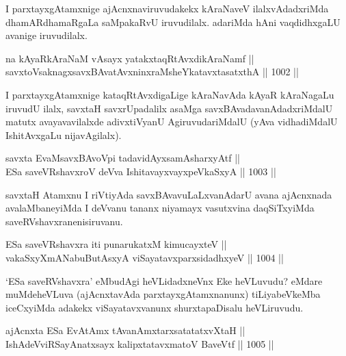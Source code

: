\begin{artha}
 I parxtayxgAtamxnige ajAcnxnaviruvudakekx kAraNaveV ilalxvAdadxriMda dhamARdhamaRgaLa saMpakaRvU iruvudilalx. adariMda hAni vaqdidhxgaLU avanige iruvudilalx.
\end{artha}


\begin{shl}
na kAyaRkAraNaM vA\s sayx yatakxtaqRtAvxdikAraNamf || \\
savxtoV\s saknagxsavxBAvatAvxninxraMsheYkatavxtasatxthA \hfill || 1002 ||  
\end{shl}

\begin{artha}
I parxtayxgAtamxnige kataqRtAvxdigaLige kAraNavAda kAyaR kAraNagaLu iruvudU ilalx, savxtaH savxrUpadalilx asaMga savxBAvadavanAdadxriMdalU matutx avayavavilalxde adivxtiVyanU AgiruvudariMdalU (yAva vidhadiMdalU IshitAvxgaLu nijavAgilalx).
\end{artha}

\begin{shl}
savxta EvaMsavxBAvoV\s pi tadavidAyxsamAsharxyAtf || \\
ESa saveVRshavxroV deVva IshitavayxvayxpeVkaSxyA \hfill || 1003 ||  
\end{shl}

\begin{artha}
savxtaH Atamxnu I riVtiyAda savxBAvavuLaLxvanAdarU avana ajAcnxnada avalaMbaneyiMda I deVvanu tananx niyamayx vasutxvina daqSiTxyiMda saveRVshavxranenisiruvanu.
\end{artha}


\begin{shl}
ESa saveVRshavxra iti punarukatxM kimucayxteV || \\
vakaSxyXmANabuButAsxyA viSayatavxparxsidadhxyeV \hfill || 1004 ||  
\end{shl}

\begin{artha}
`ESa saveRVshavxra' eMbudAgi heVLidadxneVnx Eke heVLuvudu? eMdare muMdeheVLuva (ajAcnxtavAda parxtayxgAtamxnanunx) tiLiyabeVkeMba iceCxyiMda adakekx viSayatavxvanunx shurxtapaDisalu heVLiruvudu.
\end{artha}

\begin{shl}
ajAcnxta ESa EvA\s \s tAmx tAvanAmxtarxsatatatxvXtaH || \\
IshAdeVviRSayAnatxsayx kalipxtatavxmatoV BaveVtf \hfill || 1005 ||  
\end{shl}

